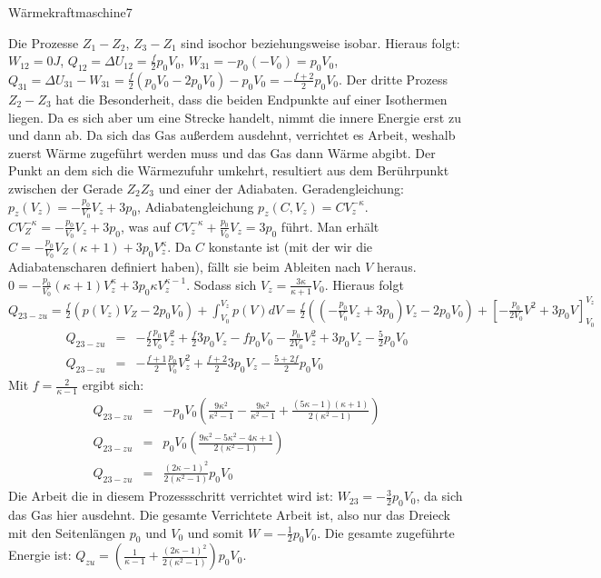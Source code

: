 \begin{problem}{Wärmekraftmaschine}{7}
\begin{solution}
Die Prozesse $Z_1 - Z_2$, $Z_3 - Z_1$ sind isochor beziehungsweise isobar. Hieraus folgt: $W_{12}=0J$, $Q_{12}=\Delta U_{12}=\frac f2 p_0V_0$, $W_{31}=-p_0(-V_0)=p_0V_0$, $Q_{31}=\Delta U_{31}-W_{31}=\frac f2 (p_0V_0-2p_0V_0)-p_0V_0=-\frac{f+2}2p_0V_0$. Der dritte Prozess $Z_2-Z_3$ hat die Besonderheit, dass die beiden Endpunkte auf einer Isothermen liegen. Da es sich aber um eine Strecke handelt, nimmt die innere Energie erst zu und dann ab. Da sich das Gas außerdem ausdehnt, verrichtet es Arbeit, weshalb zuerst Wärme zugeführt werden muss und das Gas dann Wärme abgibt. Der Punkt an dem sich die Wärmezufuhr umkehrt, resultiert aus dem Berührpunkt zwischen der Gerade $Z_2Z_3$ und einer der Adiabaten. Geradengleichung: $p_z(V_z)=-\frac{p_0}{V_0}V_z+3p_0$, Adiabatengleichung $p_z(C,V_z)=CV_z^{-\kappa}$. $CV_Z^{-\kappa}=-\frac{p_0}{V_0}V_z+3p_0$, was auf $CV_{z}^{-\kappa}+\frac{p_0}{V_0}V_z=3p_0$ führt. Man erhält $C=-\frac{p_0}{V_0}V_Z(\kappa+1)+3p_0V_z^{\kappa}$. Da $C$ konstante ist (mit der wir die Adiabatenscharen definiert haben), fällt sie beim Ableiten nach $V$ heraus. $0=-\frac{p_0}{V_0}(\kappa+1)V_z^{\kappa}+3p_0\kappa V_z^{\kappa -1}$. Sodass sich $V_z=\frac{3\kappa}{\kappa+1}V_0$. Hieraus folgt $Q_{23-zu}=\frac f2 (p(V_z)V_Z-2p_0V_0)+\int_{V_0}^{V_z}p(V)dV=\frac f2 ((-\frac{p_0}{V_0}V_z+3p_0)V_z-2p_0V_0)+[-\frac{p_0}{2V_0}V^2+3p_0V]_{V_0}^{V_z}$
\begin{eqnarray}
\nonumber Q_{23-zu}&=&-\frac f2\frac{p_0}{V_0}V_z^2+\frac f23p_0V_z-fp_0V_0-\frac{p_0}{2V_0}V_z^2+3p_0V_z-\frac 52p_0V_0\\
\nonumber Q_{23-zu}&=&-\frac{f+1}2\frac{p_0}{V_0}V_z^2+\frac{f+2}23p_0V_z-\frac{5+2f}2p_0V_0
\end{eqnarray}
Mit $f=\frac 2{\kappa-1}$ ergibt sich:
\begin{eqnarray}
\nonumber Q_{23-zu}&=&-p_0V_0\left(\frac{9\kappa^2}{\kappa^2-1}-\frac{9\kappa^2}{\kappa^2-1}+\frac{(5\kappa -1)(\kappa +1)}{2(\kappa^2-1)}\right)\\
\nonumber Q_{23-zu}&=&p_0V_0\left(\frac{9\kappa^2-5\kappa^2-4\kappa+1}{2(\kappa^2-1)}\right)\\
\nonumber Q_{23-zu}&=&\frac{(2\kappa-1)^2}{2(\kappa^2-1)}p_0V_0
\end{eqnarray}
Die Arbeit die in diesem Prozessschritt verrichtet wird ist: $W_{23}=-\frac 32p_0V_0$, da sich das Gas hier ausdehnt. Die gesamte Verrichtete Arbeit ist, also nur das Dreieck mit den Seitenlängen $p_0$ und $V_0$ und somit $W=-\frac 12p_0V_0$. Die gesamte zugeführte Energie ist: $Q_{zu}=(\frac 1{\kappa -1}+\frac{(2\kappa-1)^2}{2(\kappa^2-1)})p_0V_0$.

\end{solution}
\end{problem}
